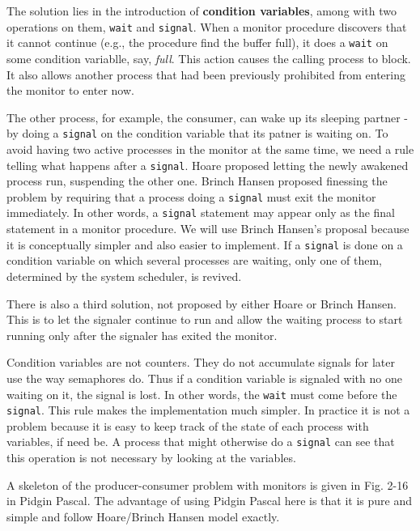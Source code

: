 \documentclass{book}
\newcommand {\kw}  [1] {\textbf{#1}}
\newcommand {\sys} [1] {\textsl{#1}}
\newcommand {\cmd} [1] {\texttt{#1}}
\begin{document}
The solution lies in the introduction of \kw{condition variables}, among with two operations on them, \cmd{wait} and \cmd{signal}.
When a monitor procedure discovers that it cannot continue (e.g., the procedure find the buffer full),
it does a \cmd{wait} on some condition variablle, say, \sys{full}.
This action causes the calling process to block.
It also allows another process that had been previously prohibited from entering the monitor to enter now.

The other process, for example, the consumer, can wake up its sleeping partner - 
by doing a \cmd{signal} on the condition variable that its patner is waiting on.
To avoid having two active processes in the monitor at the same time, we need a rule telling what happens after a \cmd{signal}.
Hoare proposed letting the newly awakened process run, suspending the other one.
Brinch Hansen proposed finessing the problem by requiring that a process doing a \cmd{signal} must exit the monitor immediately.
In other words, a \cmd{signal} statement may appear only as the final statement in a monitor procedure.
We will use Brinch Hansen's proposal because it is conceptually simpler and also easier to implement.
If a \cmd{signal} is done on a condition variable on which several processes are waiting, 
only one of them, determined by the system scheduler, is revived.

There is also a third solution, not proposed by either Hoare or Brinch Hansen.
This is to let the signaler continue to run and allow the waiting process to start running only after the signaler has exited the monitor.

Condition variables are not counters.
They do not accumulate signals for later use the way semaphores do.
Thus if a condition variable is signaled with no one waiting on it, the signal is lost.
In other words, the \cmd{wait} must come before the \cmd{signal}.
This rule makes the implementation much simpler.
In practice it is not a problem because it is easy to keep track of the state of each process with variables, if need be.
A process that might otherwise do a \cmd{signal} can see that this operation is not necessary by looking at the variables.

A skeleton of the producer-consumer problem with monitors is given in Fig. 2-16 in Pidgin Pascal.
The advantage of using Pidgin Pascal here is that it is pure and simple 
and follow Hoare/Brinch Hansen model exactly.
\end{document}
